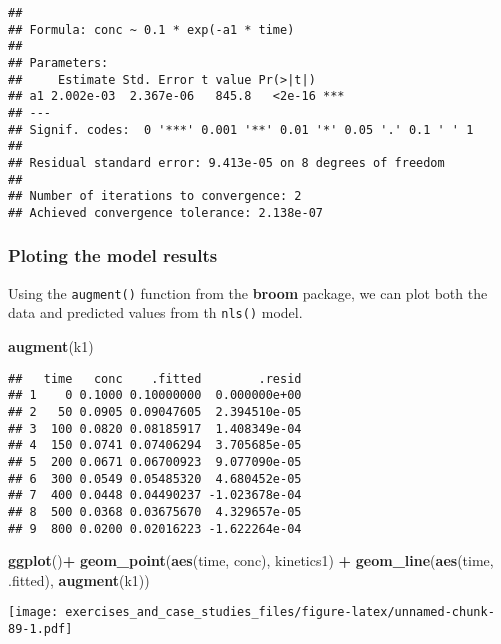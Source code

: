 \documentclass[]{book}
\newenvironment{Shaded}{\begin{snugshade}}{\end{snugshade}}
\newcommand{\KeywordTok}[1]{\textcolor[rgb]{0.13,0.29,0.53}{\textbf{#1}}}
\newcommand{\NormalTok}[1]{#1}
\newcommand{\OperatorTok}[1]{\textcolor[rgb]{0.81,0.36,0.00}{\textbf{#1}}}
\newcommand{\StringTok}[1]{\textcolor[rgb]{0.31,0.60,0.02}{#1}}
\theoremstyle{definition}
\theoremstyle{definition}
\theoremstyle{definition}
\theoremstyle{remark}
\begin{document}
\begin{verbatim}
## 
## Formula: conc ~ 0.1 * exp(-a1 * time)
## 
## Parameters:
##     Estimate Std. Error t value Pr(>|t|)    
## a1 2.002e-03  2.367e-06   845.8   <2e-16 ***
## ---
## Signif. codes:  0 '***' 0.001 '**' 0.01 '*' 0.05 '.' 0.1 ' ' 1
## 
## Residual standard error: 9.413e-05 on 8 degrees of freedom
## 
## Number of iterations to convergence: 2 
## Achieved convergence tolerance: 2.138e-07
\end{verbatim}

\hypertarget{ploting-the-model-results}{%
\subsubsection{Ploting the model
results}\label{ploting-the-model-results}}

Using the \texttt{augment()} function from the \textbf{broom} package,
we can plot both the data and predicted values from th \texttt{nls()}
model.

\begin{Shaded}
\begin{Highlighting}[]
\KeywordTok{augment}\NormalTok{(k1)}
\end{Highlighting}
\end{Shaded}

\begin{verbatim}
##   time   conc    .fitted        .resid
## 1    0 0.1000 0.10000000  0.000000e+00
## 2   50 0.0905 0.09047605  2.394510e-05
## 3  100 0.0820 0.08185917  1.408349e-04
## 4  150 0.0741 0.07406294  3.705685e-05
## 5  200 0.0671 0.06700923  9.077090e-05
## 6  300 0.0549 0.05485320  4.680452e-05
## 7  400 0.0448 0.04490237 -1.023678e-04
## 8  500 0.0368 0.03675670  4.329657e-05
## 9  800 0.0200 0.02016223 -1.622264e-04
\end{verbatim}

\begin{Shaded}
\begin{Highlighting}[]
\KeywordTok{ggplot}\NormalTok{()}\OperatorTok{+}
\StringTok{  }\KeywordTok{geom_point}\NormalTok{(}\KeywordTok{aes}\NormalTok{(time, conc), kinetics1) }\OperatorTok{+}
\StringTok{  }\KeywordTok{geom_line}\NormalTok{(}\KeywordTok{aes}\NormalTok{(time, .fitted), }\KeywordTok{augment}\NormalTok{(k1))}
\end{Highlighting}
\end{Shaded}

\texttt{[image: exercises\_and\_case\_studies\_files/figure-latex/unnamed-chunk-89-1.pdf]}
\end{document}
